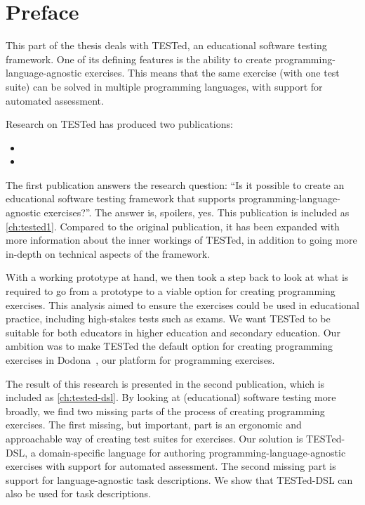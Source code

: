 \documentclass[./main]{subfiles}
\begin{document}
\chapter*{Preface}

This part of the thesis deals with TESTed, an educational software testing framework.
One of its defining features is the ability to create programming-language-agnostic exercises.
This means that the same exercise (with one test suite) can be solved in multiple programming languages, with support for automated assessment.

Research on TESTed has produced two publications:

\begin{itemize}
    \item {}
    \item {}
\end{itemize}

The first publication answers the research question: ``Is it possible to create an educational software testing framework that supports programming-language-agnostic exercises?''.
The answer is, spoilers, yes.
This publication is included as \cref{ch:tested1}.
Compared to the original publication, it has been expanded with more information about the inner workings of TESTed, in addition to going more in-depth on technical aspects of the framework.

With a working prototype at hand, we then took a step back to look at what is required to go from a prototype to a viable option for creating programming exercises.
This analysis aimed to ensure the exercises could be used in educational practice, including high-stakes tests such as exams.
We want TESTed to be suitable for both educators in higher education and secondary education.
Our ambition was to make TESTed the default option for creating programming exercises in Dodona~\autocite{vanpetegemDodonaLearnCode2023}, our platform for programming exercises.

The result of this research is presented in the second publication, which is included as \cref{ch:tested-dsl}.
By looking at (educational) software testing more broadly, we find two missing parts of the process of creating programming exercises.
The first missing, but important, part is an ergonomic and approachable way of creating test suites for exercises.
Our solution is TESTed-DSL, a domain-specific language for authoring programming-language-agnostic exercises with support for automated assessment.
The second missing part is support for language-agnostic task descriptions.
We show that TESTed-DSL can also be used for task descriptions.
\end{document}
